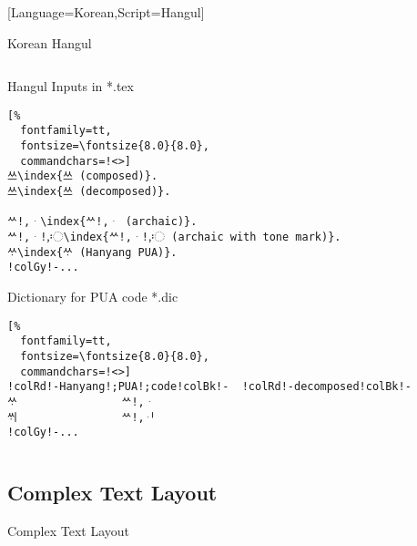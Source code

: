 \documentclass[aspectratio=169,10pt]{beamer}
\begin{document}
\setmonofont{Noto Sans Mono CJK KR}[Language=Korean,Script=Hangul]
\begin{frame}[fragile]{Korean Hangul}

\begin{columns}
\begin{column}{70mm}

\setmonofont{Noto Sans Mono CJK KR}
\begin{exampleblock}{Hangul Inputs in *.tex}
\begin{Verbatim}[%
  fontfamily=tt,
  fontsize=\fontsize{8.0}{8.0},
  commandchars=!<>]
쓰\index{쓰 (composed)}.
쓰\index{쓰 (decomposed)}.

ᄊ!,ᆞ\index{ᄊ!,ᆞ (archaic)}.
ᄊ!,ᆞ!,〯\index{ᄊ!,ᆞ!,〯 (archaic with tone mark)}.
ᄊᆞ\index{ᄊᆞ (Hanyang PUA)}.
!colGy!-...
\end{Verbatim}
\end{exampleblock}
\begin{exampleblock}{Dictionary for PUA code *.dic}
\begin{Verbatim}[%
  fontfamily=tt,
  fontsize=\fontsize{8.0}{8.0},
  commandchars=!<>]
!colRd!-Hanyang!;PUA!;code!colBk!-  !colRd!-decomposed!colBk!-
ᄊᆞ                ᄊ!,ᆞ
ᄊᆡ                ᄊ!,ᆡ
!colGy!-...
\end{Verbatim}
\end{exampleblock}
\end{column}

\begin{column}{60mm}
\begin{center}
%
\end{center}
\end{column}
\end{columns}

\end{frame}


\subsection{Complex Text Layout}
\begin{frame}{Complex Text Layout}
\begin{columns}
\end{columns}
\end{frame}
\end{document}
